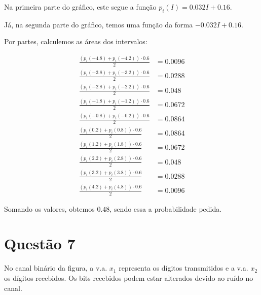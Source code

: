 \documentclass[a5paper]{report}
\begin{document}
Na primeira parte do gráfico, este segue a função $p_i(I) = 0.032I + 0.16$.

Já, na segunda parte do gráfico, temos uma função da forma $-0.032I + 0.16$.

Por partes, calculemos as áreas dos intervalos:

\begin{align*}
	\frac{(p_i(-4.8) + p_i(-4.2)) \cdot 0.6}{2} &= 0.0096\\
	\frac{(p_i(-3.8) + p_i(-3.2)) \cdot 0.6}{2} &= 0.0288\\
	\frac{(p_i(-2.8) + p_i(-2.2)) \cdot 0.6}{2} &= 0.048\\
	\frac{(p_i(-1.8) + p_i(-1.2)) \cdot 0.6}{2} &= 0.0672\\
	\frac{(p_i(-0.8) + p_i(-0.2)) \cdot 0.6}{2} &= 0.0864\\
	\frac{(p_i( 0.2) + p_i( 0.8)) \cdot 0.6}{2} &= 0.0864\\
	\frac{(p_i( 1.2) + p_i( 1.8)) \cdot 0.6}{2} &= 0.0672\\
	\frac{(p_i( 2.2) + p_i( 2.8)) \cdot 0.6}{2} &= 0.048\\
	\frac{(p_i( 3.2) + p_i( 3.8)) \cdot 0.6}{2} &= 0.0288\\
	\frac{(p_i( 4.2) + p_i( 4.8)) \cdot 0.6}{2} &= 0.0096
\end{align*}

Somando os valores, obtemos $0.48$, sendo essa a probabilidade pedida.


\section*{Questão 7}
No canal binário da figura, a v.a. $x_1$ representa os dígitos transmitidos e a v.a. $x_2$ os dígitos recebidos. Os bits recebidos podem estar alterados devido ao ruído no canal.

\begin{figure}[ht]
	\begin{center}
	\end{center}
\end{figure}
\end{document}
